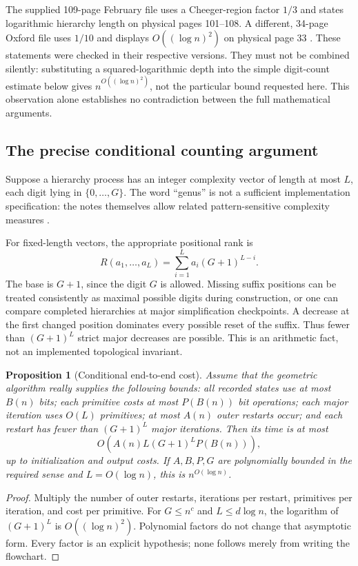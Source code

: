 \documentclass[11pt]{article}
\newtheorem{proposition}[theorem]{Proposition}
\theoremstyle{definition}\newtheorem{definition}[theorem]{Definition}
\begin{document}
The supplied 109-page February file uses a Cheeger-region factor $1/3$ and
states logarithmic hierarchy length on physical pages 101--108. A different,
34-page Oxford file uses $1/10$ and displays $O((\log n)^2)$ on physical page 33
\cite{oxford}. These statements were checked in their respective versions.
They must not be combined silently: substituting a squared-logarithmic depth
into the simple digit-count estimate below gives
$n^{O((\log n)^2)}$, not the particular bound requested here. This observation
alone establishes no contradiction between the full mathematical arguments.

\subsection{The precise conditional counting argument}

Suppose a hierarchy process has an integer complexity vector of length at most
$L$, each digit lying in $\{0,\ldots,G\}$. The word ``genus'' is not a sufficient
implementation specification: the notes themselves allow related
pattern-sensitive complexity measures \cite[physical pages 54--59]{notes}.

For fixed-length vectors, the appropriate positional rank is
\begin{equation}\label{eq:rank}
 R(a_1,\ldots,a_L)=\sum_{i=1}^L a_i(G+1)^{L-i}.
\end{equation}
The base is $G+1$, since the digit $G$ is allowed. Missing suffix positions can
be treated consistently as maximal possible digits during construction, or
one can compare completed hierarchies at major simplification checkpoints.
A decrease at the first changed position dominates every possible reset of
the suffix. Thus fewer than $(G+1)^L$ strict major decreases are possible.
This is an arithmetic fact, not an implemented topological invariant.

\begin{proposition}[Conditional end-to-end cost]
Assume that the geometric algorithm really supplies the following bounds:
all recorded states use at most $B(n)$ bits; each primitive costs at most
$P(B(n))$ bit operations; each major iteration uses $O(L)$ primitives; at most
$A(n)$ outer restarts occur; and each restart has fewer than $(G+1)^L$ major
iterations. Then its time is at most
\[
 O\!\left(A(n)L(G+1)^L P(B(n))\right),
\]
up to initialization and output costs. If $A,B,P,G$ are polynomially bounded
in the required sense and $L=O(\log n)$, this is $n^{O(\log n)}$.
\end{proposition}
\begin{proof}
Multiply the number of outer restarts, iterations per restart, primitives per
iteration, and cost per primitive. For $G\le n^c$ and $L\le d\log n$, the
logarithm of $(G+1)^L$ is $O((\log n)^2)$. Polynomial factors do not change
that asymptotic form. Every factor is an explicit hypothesis; none follows
merely from writing the flowchart.
\end{proof}
\end{document}
